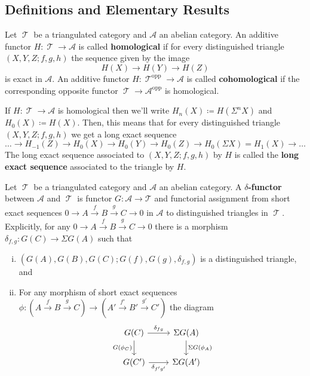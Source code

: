 \documentclass[11pt]{article}
\DeclareMathOperator{\TT}{\mathcal{T}}
\begin{document}
\subsection{Definitions and Elementary Results}

\begin{defn}
Let $\TT$ be a triangulated category and $\mathcal{A}$ an abelian category. An additive functor $H: \TT \to \mathcal{A}$ is called \textbf{homological} if for every distinguished triangle $(X,Y,Z; f,g,h)$ the sequence given by the image
\[
	H(X) \to H(Y) \to H(Z)
\]
is exact in $\mathcal{A}$. An additive functor $H: \TT^{\text{opp}} \to \mathcal{A}$ is called \textbf{cohomological} if the corresponding opposite functor $\TT \to \mathcal{A}^{\text{opp}}$ is homological.

If $H: \TT \to \mathcal{A}$ is homological then we'll write $H_n(X) \coloneqq H(\Sigma^n X)$ and $H_0(X) \coloneqq H(X)$. Then, this means that for every distinguished triangle $(X,Y,Z; f,g,h)$ we get a long exact sequence 
\[
	\hdots \to H_{-1}(Z) \to H_{0}(X) \to H_0(Y) \to H_0(Z) \to H_0(\Sigma X) = H_1(X) \to \hdots
\]
The long exact sequence associated to $(X,Y,Z; f,g,h)$ by $H$ is called the \textbf{long exact sequence} associated to the triangle by $H$.
\end{defn}

\begin{defn}
Let $\TT$ be a triangulated category and $\mathcal{A}$ an abelian category. A \textbf{$\delta$-functor} between $\mathcal{A}$ and $\TT$ is functor $G: \mathcal{A} \to \mathcal{T}$ and functorial assignment from short exact sequences $0 \to A \xrightarrow{f} B \xrightarrow{g} C \to 0$ in $\mathcal{A}$ to distinguished triangles in $\TT$. Explicitly, for any $0 \to A \xrightarrow{f} B \xrightarrow{g} C \to 0$ there is a morphism $\delta_{f,g}: G(C) \to \Sigma G(A)$ such that
\begin{enumerate}[i.]
	\item $(G(A),G(B),G(C); G(f),G(g),\delta_{f,g})$ is a distinguished triangle, and
	\item For any morphism of short exact sequences $\phi: (A \xrightarrow{f} B \xrightarrow{g} C) \to (A' \xrightarrow{f'} B' \xrightarrow{g'} C')$ the diagram 
		\[\begin{tikzcd}
G(C) \ar[r,"\delta_{fg}"] \ar[d,"G(\phi_C)"'] & \Sigma G(A) \ar[d,"\Sigma G(\phi_A)"] \\
G(C') \ar[r,"\delta_{f'g'}"'] & \Sigma G(A') \\
		\end{tikzcd}\]
\end{enumerate}
\end{defn}
\end{document}
